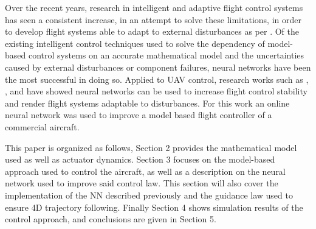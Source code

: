 Over the recent years, research in intelligent and adaptive flight control systems has seen a consistent increase, in an attempt to solve these limitations, in order to develop flight systems able to adapt to external disturbances as per \cite{SotA_IFCS}. Of the existing intelligent control techniques used to solve the dependency of model-based control systems on an accurate mathematical model and the uncertainties caused by external disturbances or component failures, neural networks have been the most successful in doing so. Applied to UAV control, research works such as \cite{online_adaptiveNN}, \cite{UAV_adaptive}, \cite{UAV_adaptive2} and \cite{YANG+LIN_Adaptive_Flight_Control} have showed neural networks can be used to increase flight control stability and render flight systems adaptable to disturbances. For this work an online neural network was used to improve a model based flight controller of a commercial aircraft. 

This paper is organized as follows, Section 2  provides the mathematical model used as well as actuator dynamics. Section 3 focuses on the model-based approach used to control the aircraft, as well as a description on the neural network used to improve said control law. This section will also cover the implementation of the NN described previously and the guidance law used to ensure 4D trajectory following. Finally Section 4 shows simulation results of the control approach, and conclusions are given in Section 5.
